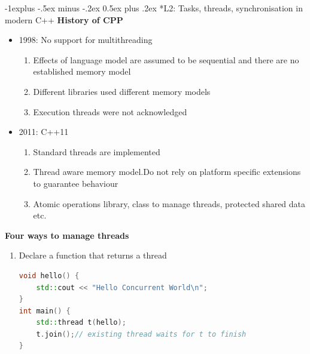 \documentclass[10pt, landscape]{article}
\makeatletter
\renewcommand{\subsection}{\@startsection{subsection}{2}{0mm}%
                                {-1explus -.5ex minus -.2ex}%
                                {0.5ex plus .2ex}%
                                {\normalfont\normalsize\bfseries}}
\makeatother
\begin{document}
\begin{multicols}{4}
\subsection*{L2: Tasks, threads, synchronisation in modern C++}
\textbf{History of CPP} \\
\begin{itemize}
    \item 1998: No support for multithreading
    \begin{enumerate}
        \item Effects of language model are assumed to be sequential and there are no established memory model
        \item Different libraries used different memory models
        \item Execution threads were not acknowledged
    \end{enumerate}
    \item 2011: C++11
    \begin{enumerate}
        \item Standard threads are implemented
        \item Thread aware memory model.Do not rely on platform specific extensions to guarantee behaviour
        \item Atomic operations library, class to manage threads, protected shared data etc. 
    \end{enumerate}
\end{itemize}

\textbf{Four ways to manage threads} \\ 
\begin{enumerate}
    \item Declare a function that returns a thread

    \begin{lstlisting}[language=c++,breaklines=true, breakatwhitespace=true]
void hello() {
    std::cout << "Hello Concurrent World\n";
}
int main() {
    std::thread t(hello);
    t.join();// existing thread waits for t to finish
}
    \end{lstlisting}


\end{enumerate}
\end{multicols}
\end{document}
